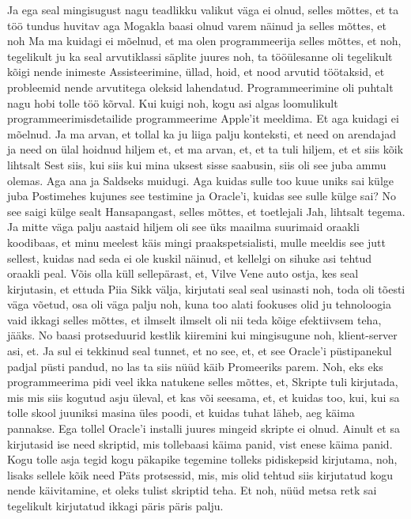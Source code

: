 Ja ega seal mingisugust nagu teadlikku valikut väga ei olnud, selles mõttes, et ta töö tundus huvitav aga Mogakla baasi olnud varem näinud ja selles mõttes, et noh
Ma ma kuidagi ei mõelnud, et ma olen programmeerija selles mõttes, et noh, tegelikult ju ka seal arvutiklassi säplite juures noh, ta tööülesanne oli tegelikult kõigi nende inimeste Assisteerimine, üllad, hoid, et nood arvutid töötaksid, et probleemid nende arvutitega oleksid lahendatud. Programmeerimine oli puhtalt nagu hobi tolle töö kõrval. Kui kuigi noh, kogu asi algas loomulikult programmeerimisdetailide programmeerime Apple'it meeldima. Et aga kuidagi ei mõelnud. Ja ma arvan, et tollal ka ju liiga palju konteksti, et need on arendajad ja need on ülal hoidnud hiljem et, et ma arvan, et, et ta tuli hiljem, et et siis kõik lihtsalt
Sest siis, kui siis kui mina uksest sisse saabusin, siis oli see juba ammu olemas.
Aga ana ja Saldseks muidugi.
Aga kuidas sulle too kuue uniks sai külge juba Postimehes kujunes see testimine ja Oracle'i, kuidas see sulle külge sai?
No see saigi külge sealt Hansapangast, selles mõttes, et toetlejali
Jah, lihtsalt tegema. Ja mitte väga palju aastaid hiljem oli see üks maailma suurimaid oraakli koodibaas, et minu meelest käis mingi praakspetsialisti, mulle meeldis see jutt sellest, kuidas nad seda ei ole kuskil näinud, et kellelgi on sihuke asi tehtud oraakli peal.
Võis olla küll sellepärast, et,
Vilve Vene auto ostja, kes seal kirjutasin, et ettuda Piia Sikk välja, kirjutati seal seal usinasti noh, toda oli tõesti väga võetud, osa oli väga palju noh, kuna too alati fookuses olid ju tehnoloogia vaid ikkagi selles mõttes, et ilmselt ilmselt oli nii teda kõige efektiivsem teha, jääks. No baasi protseduurid kestlik kiiremini kui mingisugune noh, klient-server asi, et.
Ja sul ei tekkinud seal tunnet, et no see, et, et see Oracle'i püstipanekul padjal püsti pandud, no las ta siis nüüd käib Promeeriks parem.
Noh, eks eks programmeerima pidi veel ikka natukene selles mõttes, et,
Skripte tuli kirjutada, mis mis siis kogutud asju üleval, et kas või seesama, et, et kuidas too, kui, kui sa tolle skool juuniksi masina üles poodi, et kuidas tuhat läheb, aeg käima pannakse. Ega tollel Oracle'i installi juures mingeid skripte ei olnud. Ainult et sa kirjutasid ise need skriptid, mis tollebaasi käima panid, vist enese käima panid. Kogu tolle asja tegid kogu päkapike tegemine tolleks pidiskepsid kirjutama, noh, lisaks sellele kõik need Päts protsessid, mis, mis olid tehtud siis kirjutatud kogu nende käivitamine, et oleks tulist skriptid teha. Et noh, nüüd metsa retk sai tegelikult kirjutatud ikkagi päris päris palju.
